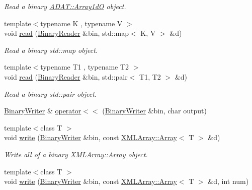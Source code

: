 \begin{DoxyCompactItemize}
\begin{DoxyCompactList}\small\item\em Read a binary \mbox{\hyperlink{classADAT_1_1Array1dO}{A\+D\+A\+T\+::\+Array1dO}} object. \end{DoxyCompactList}\item 
{\footnotesize template$<$typename K , typename V $>$ }\\void \mbox{\hyperlink{namespaceADATIO_aae6ee71c391ad98e959febc86231331b}{read}} (\mbox{\hyperlink{classADATIO_1_1BinaryReader}{Binary\+Reader}} \&bin, std\+::map$<$ K, V $>$ \&d)
\begin{DoxyCompactList}\small\item\em Read a binary std\+::map object. \end{DoxyCompactList}\item 
{\footnotesize template$<$typename T1 , typename T2 $>$ }\\void \mbox{\hyperlink{namespaceADATIO_a746a6511817f141011d50005a099feec}{read}} (\mbox{\hyperlink{classADATIO_1_1BinaryReader}{Binary\+Reader}} \&bin, std\+::pair$<$ T1, T2 $>$ \&d)
\begin{DoxyCompactList}\small\item\em Read a binary std\+::pair object. \end{DoxyCompactList}\item 
\mbox{\hyperlink{classADATIO_1_1BinaryWriter}{Binary\+Writer}} \& \mbox{\hyperlink{namespaceADATIO_a4b4f8d8951c5d9ed7f144ea43e01dd67}{operator$<$$<$}} (\mbox{\hyperlink{classADATIO_1_1BinaryWriter}{Binary\+Writer}} \&bin, char output)
\item 
{\footnotesize template$<$class T $>$ }\\void \mbox{\hyperlink{namespaceADATIO_a70c8ce102a5eca8961bb57bf7b8b6bd1}{write}} (\mbox{\hyperlink{classADATIO_1_1BinaryWriter}{Binary\+Writer}} \&bin, const \mbox{\hyperlink{classXMLArray_1_1Array}{X\+M\+L\+Array\+::\+Array}}$<$ T $>$ \&d)
\begin{DoxyCompactList}\small\item\em Write all of a binary \mbox{\hyperlink{classXMLArray_1_1Array}{X\+M\+L\+Array\+::\+Array}} object. \end{DoxyCompactList}\item 
{\footnotesize template$<$class T $>$ }\\void \mbox{\hyperlink{namespaceADATIO_a7a09030036bf1cc4704ecdcdf4cd6090}{write}} (\mbox{\hyperlink{classADATIO_1_1BinaryWriter}{Binary\+Writer}} \&bin, const \mbox{\hyperlink{classXMLArray_1_1Array}{X\+M\+L\+Array\+::\+Array}}$<$ T $>$ \&d, int num)

\end{DoxyCompactItemize}
